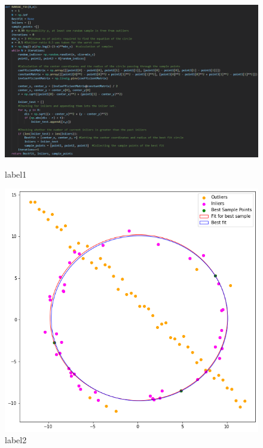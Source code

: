 \documentclass[11pt]{article}
\begin{document}
\begin{flushleft}
\hspace{-3cm}
\begin{figure}[H]
    \centering
    \begin{minipage}{.5\textwidth}
      \centering
        \includegraphics[width=1.\textwidth]{Question1code.png}
        \caption{label1}
      \label{fig:test1}
    \end{minipage}%
    \begin{minipage}{.5\textwidth}
      \centering
        \includegraphics[width=1.\textwidth]{Question1output.png}
        \caption{label2}
      \label{fig:test2}
    \end{minipage}
\end{figure}


\end{flushleft}
\end{document}
